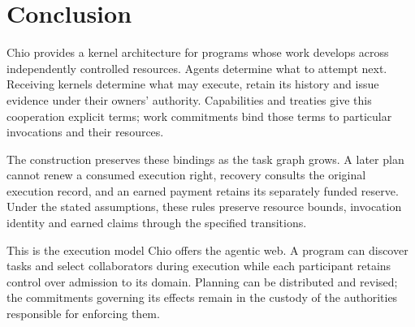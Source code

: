 \section{Conclusion}
Chio provides a kernel architecture for programs whose work develops across
independently controlled resources. Agents determine what to attempt next.
Receiving kernels determine what may execute, retain its history and issue
evidence under their owners' authority. Capabilities and treaties give this
cooperation explicit terms; work commitments bind those terms to particular
invocations and their resources.

The construction preserves these bindings as the task graph grows. A later
plan cannot renew a consumed execution right, recovery consults the original
execution record, and an earned payment retains its separately funded reserve.
Under the stated assumptions, these rules preserve resource bounds, invocation
identity and earned claims through the specified transitions.

This is the execution model Chio offers the agentic web. A program can discover
tasks and select collaborators during execution while each participant retains
control over admission to its domain. Planning can be distributed and revised;
the commitments governing its effects remain in the custody of the authorities
responsible for enforcing them.

